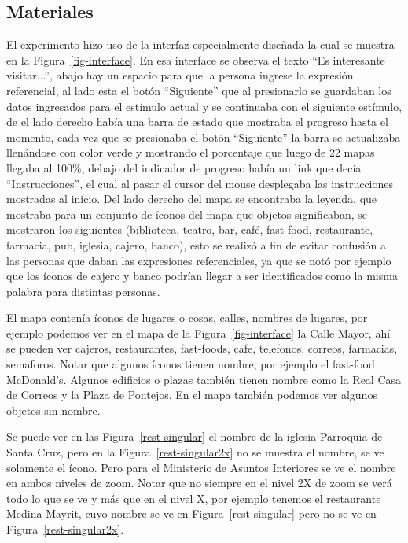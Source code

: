 \subsection{Materiales}
\label{corpus-materiales}

El experimento hizo uso de la interfaz especialmente dise\~nada la cual se muestra en la Figura~\ref{fig-interface}. En esa interface se observa el texto ``Es interesante visitar...'', abajo hay un espacio para que la persona ingrese la expresi\'on referencial, al lado esta el bot\'on ``Siguiente'' que  al presionarlo se guardaban los datos ingresados para el est\'imulo actual y se continuaba con el siguiente est\'imulo, de el lado derecho hab\'ia una barra de estado que mostraba el progreso hasta el momento, cada vez que se presionaba el bot\'on ``Siguiente'' la barra se actualizaba llen\'andose con color verde y mostrando el porcentaje que luego de 22 mapas llegaba al 100\%, debajo del indicador de progreso hab\'ia un link que dec\'ia ``Instrucciones'', el cual al pasar el cursor del mouse desplegaba las instrucciones mostradas al inicio.
Del lado derecho del mapa se encontraba la leyenda, que mostraba para un conjunto de \'iconos del mapa que objetos significaban, se mostraron los siguientes (biblioteca, teatro, bar, caf\'e, fast-food, restaurante, farmacia, pub, iglesia, cajero, banco), esto se realiz\'o a fin de evitar confusi\'on a las personas que daban las expresiones referenciales, ya que se not\'o por ejemplo que los \'iconos de cajero y banco podr\'ian llegar a ser identificados como la misma palabra para distintas personas. 

El mapa conten\'ia \'iconos de lugares o cosas, calles, nombres de lugares, por ejemplo podemos ver en el mapa de la Figura~\ref{fig-interface} la Calle Mayor, ah\'i se pueden ver cajeros, restaurantes, fast-foods, cafe, telefonos, correos, farmacias, semaforos. Notar que algunos \'iconos tienen nombre, por ejemplo el fast-food McDonald's. Algunos edificios o plazas tambi\'en tienen nombre como la Real Casa de Correos y la Plaza de Pontejos. En el mapa tambi\'en podemos ver algunos objetos sin nombre.

Se puede ver en las Figura~\ref{rest-singular} el nombre de la iglesia Parroquia de Santa Cruz, pero en la Figura~\ref{rest-singular2x} no se muestra el nombre, se ve solamente el \'icono. Pero para el Ministerio de Asuntos Interiores se ve el nombre en ambos niveles de zoom. Notar que no siempre en el nivel 2X de zoom se ver\'a todo lo que se ve y m\'as que en el nivel X, por ejemplo tenemos el restaurante Medina Mayrit, cuyo nombre se ve en Figura~\ref{rest-singular} pero no se ve en Figura~\ref{rest-singular2x}. 

